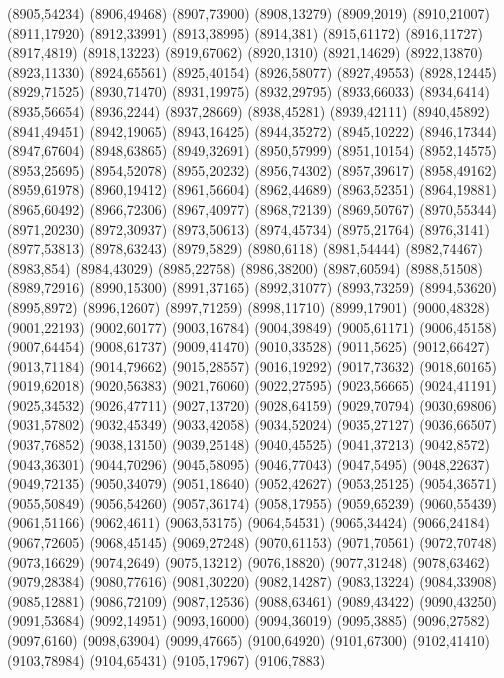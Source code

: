 (8905,54234)
(8906,49468)
(8907,73900)
(8908,13279)
(8909,2019)
(8910,21007)
(8911,17920)
(8912,33991)
(8913,38995)
(8914,381)
(8915,61172)
(8916,11727)
(8917,4819)
(8918,13223)
(8919,67062)
(8920,1310)
(8921,14629)
(8922,13870)
(8923,11330)
(8924,65561)
(8925,40154)
(8926,58077)
(8927,49553)
(8928,12445)
(8929,71525)
(8930,71470)
(8931,19975)
(8932,29795)
(8933,66033)
(8934,6414)
(8935,56654)
(8936,2244)
(8937,28669)
(8938,45281)
(8939,42111)
(8940,45892)
(8941,49451)
(8942,19065)
(8943,16425)
(8944,35272)
(8945,10222)
(8946,17344)
(8947,67604)
(8948,63865)
(8949,32691)
(8950,57999)
(8951,10154)
(8952,14575)
(8953,25695)
(8954,52078)
(8955,20232)
(8956,74302)
(8957,39617)
(8958,49162)
(8959,61978)
(8960,19412)
(8961,56604)
(8962,44689)
(8963,52351)
(8964,19881)
(8965,60492)
(8966,72306)
(8967,40977)
(8968,72139)
(8969,50767)
(8970,55344)
(8971,20230)
(8972,30937)
(8973,50613)
(8974,45734)
(8975,21764)
(8976,3141)
(8977,53813)
(8978,63243)
(8979,5829)
(8980,6118)
(8981,54444)
(8982,74467)
(8983,854)
(8984,43029)
(8985,22758)
(8986,38200)
(8987,60594)
(8988,51508)
(8989,72916)
(8990,15300)
(8991,37165)
(8992,31077)
(8993,73259)
(8994,53620)
(8995,8972)
(8996,12607)
(8997,71259)
(8998,11710)
(8999,17901)
(9000,48328)
(9001,22193)
(9002,60177)
(9003,16784)
(9004,39849)
(9005,61171)
(9006,45158)
(9007,64454)
(9008,61737)
(9009,41470)
(9010,33528)
(9011,5625)
(9012,66427)
(9013,71184)
(9014,79662)
(9015,28557)
(9016,19292)
(9017,73632)
(9018,60165)
(9019,62018)
(9020,56383)
(9021,76060)
(9022,27595)
(9023,56665)
(9024,41191)
(9025,34532)
(9026,47711)
(9027,13720)
(9028,64159)
(9029,70794)
(9030,69806)
(9031,57802)
(9032,45349)
(9033,42058)
(9034,52024)
(9035,27127)
(9036,66507)
(9037,76852)
(9038,13150)
(9039,25148)
(9040,45525)
(9041,37213)
(9042,8572)
(9043,36301)
(9044,70296)
(9045,58095)
(9046,77043)
(9047,5495)
(9048,22637)
(9049,72135)
(9050,34079)
(9051,18640)
(9052,42627)
(9053,25125)
(9054,36571)
(9055,50849)
(9056,54260)
(9057,36174)
(9058,17955)
(9059,65239)
(9060,55439)
(9061,51166)
(9062,4611)
(9063,53175)
(9064,54531)
(9065,34424)
(9066,24184)
(9067,72605)
(9068,45145)
(9069,27248)
(9070,61153)
(9071,70561)
(9072,70748)
(9073,16629)
(9074,2649)
(9075,13212)
(9076,18820)
(9077,31248)
(9078,63462)
(9079,28384)
(9080,77616)
(9081,30220)
(9082,14287)
(9083,13224)
(9084,33908)
(9085,12881)
(9086,72109)
(9087,12536)
(9088,63461)
(9089,43422)
(9090,43250)
(9091,53684)
(9092,14951)
(9093,16000)
(9094,36019)
(9095,3885)
(9096,27582)
(9097,6160)
(9098,63904)
(9099,47665)
(9100,64920)
(9101,67300)
(9102,41410)
(9103,78984)
(9104,65431)
(9105,17967)
(9106,7883)
